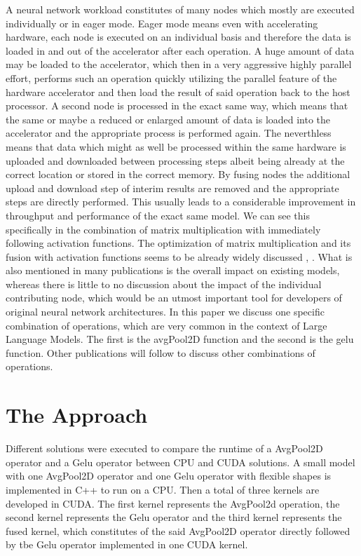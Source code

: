 \documentclass[letterpaper]{article}
\begin{document}
A neural network workload constitutes of many nodes which mostly are executed individually or in eager mode. Eager mode means even with accelerating hardware, each node is executed on an individual basis and therefore the data is loaded in and out of the accelerator after each operation. A huge amount of data may be loaded to the accelerator, which then in a very aggressive highly parallel effort, performs such an operation quickly utilizing the parallel feature of the hardware accelerator and then load the result of said operation back to the host processor. A second node is processed in the exact same way, which means that the same or maybe a reduced or enlarged amount of data is loaded into the accelerator and the appropriate process is performed again. The neverthless means that data which might as well be processed within the same hardware is uploaded and downloaded between processing steps albeit being already at the correct location or stored in the correct memory.  
By fusing nodes the additional upload and download step of interim results are removed and the appropriate steps are directly performed. This usually leads to a considerable improvement in throughput and performance of the exact same model. We can see this specifically in the combination of matrix multiplication with immediately following activation functions. The optimization of matrix multiplication and its fusion with activation functions seems to be already widely discussed , . What is also mentioned in many publications is the overall impact on existing models, whereas there is little to no discussion about the impact of the individual contributing node, which would be an utmost important tool for developers of original neural network architectures. In this paper we discuss one specific combination of operations, which are very common in the context of Large Language Models. The first is the avgPool2D function and the second is the gelu function. Other publications will follow to discuss other combinations of operations. 

\section{The Approach}
Different solutions were executed to compare the runtime of a AvgPool2D operator and a Gelu operator between CPU and CUDA solutions. A small model with one AvgPool2D operator and one Gelu operator with flexible shapes is implemented in C++ to run on a CPU. Then a total of three kernels are developed in CUDA. The first kernel represents the AvgPool2d operation, the second kernel represents the Gelu operator and the third kernel represents the fused kernel, which constitutes of the said AvgPool2D operator directly followed by tbe Gelu operator implemented in one CUDA kernel. 
\end{document}
